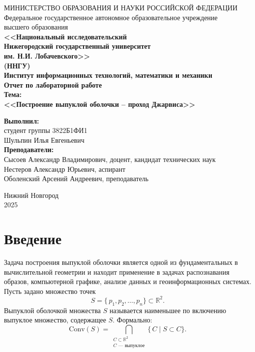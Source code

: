\documentclass[12pt,a4paper]{article}
\begin{document}
\begin{center} 
МИНИСТЕРСТВО ОБРАЗОВАНИЯ И НАУКИ РОССИЙСКОЙ ФЕДЕРАЦИИ \\
Федеральное государственное автономное образовательное учреждение  \\
высшего образования\\ \textbf{<<Национальный исследовательский \\ Нижегородский государственный университет \\
им. Н.И. Лобачевского>>}\\
\textbf{(ННГУ)}\\[0.5cm]
\textbf{Институт информационных технологий, математики и механики}\\[4.5cm]

\textbf{\large Отчет по лабораторной работе} \\[0.6cm]
\textbf{Тема:}\\
  \textbf{\large <<Построение выпуклой оболочки – проход Джарвиса>>}\\[3.0cm]
\begin{flushright}
 \begin{minipage}{0.40\textwidth}
 \begin{flushleft}
  \textbf{Выполнил:}\\[0.1cm]
  студент группы 3822Б1ФИ1 \\
  Шульпин Илья Евгеньевич  \\[1.0cm]
  \textbf{Преподаватели:}\\[0.1cm]
  Сысоев Александр Владимирович, доцент, кандидат технических наук  \\[0.1cm]
  Нестеров Александр Юрьевич, аспирант  \\[0.1cm]
  Оболенский Арсений Андреевич, преподаватель  \\
 \end{flushleft}
 \end{minipage}
\end{flushright}
 \vfill 

  Нижний Новгород \\
 2025

 \thispagestyle{empty} 

\end{center}

\newpage
\section{Введение}

Задача построения выпуклой оболочки является одной из фундаментальных в вычислительной геометрии и находит применение в задачах распознавания образов, компьютерной графике, анализе данных и геоинформационных системах. Пусть задано множество точек 
\[
S = \{\,p_1, p_2, \dots, p_n\} \subset \mathbb{R}^2.
\]
Выпуклой оболочкой множества $S$ называется наименьшее по включению выпуклое множество, содержащее $S$. Формально:
\[
\mathrm{Conv}(S) = \bigcap_{\substack{{C \subset \mathbb{R}^2}\\{C\text{ — выпуклое}}}} \{\,C \mid S \subset C\}.
\]
\end{document}
